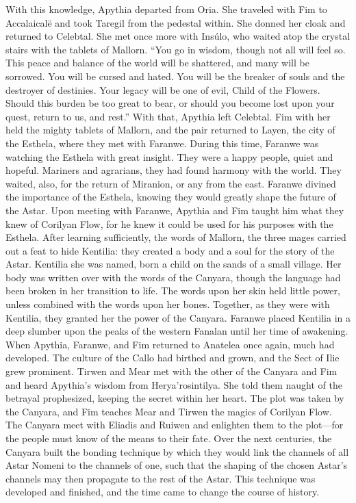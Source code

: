 \documentclass[smalldemyvopaper,11pt,twoside,onecolumn,openright,extrafontsizes]{memoir}
\begin{document}
{{With this knowledge, Apythia departed from Oria. She traveled with Fim to Accalaicalë and took Taregil from the pedestal within. She donned her cloak and returned to Celebtal. She met once more with Insúlo, who waited atop the crystal stairs with the tablets of Mallorn.
“You go in wisdom, though not all will feel so. This peace and balance of the world will be shattered, and many will be sorrowed. You will be cursed and hated. You will be the breaker of souls and the destroyer of destinies. Your legacy will be one of evil, Child of the Flowers. Should this burden be too great to bear, or should you become lost upon your quest, return to us, and rest.”
With that, Apythia left Celebtal. Fim with her held the mighty tablets of Mallorn, and the pair returned to Layen, the city of the Esthela, where they met with Faranwe.
During this time, Faranwe was watching the Esthela with great insight. They were a happy people, quiet and hopeful. Mariners and agrarians, they had found harmony with the world. They waited, also, for the return of Miranion, or any from the east. Faranwe divined the importance of the Esthela, knowing they would greatly shape the future of the Astar.
Upon meeting with Faranwe, Apythia and Fim taught him what they knew of Corilyan Flow, for he knew it could be used for his purposes with the Esthela. After learning sufficiently, the words of Mallorn, the three mages carried out a feat to hide Kentilia: they created a body and a soul for the story of the Astar. Kentilia she was named, born a child on the sands of a small village. Her body was written over with the words of the Canyara, though the language had been broken in her transition to life. The words upon her skin held little power, unless combined with the words upon her bones. Together, as they were with Kentilia, they granted her the power of the Canyara. Faranwe placed Kentilia in a deep slumber upon the peaks of the western Fanalan until her time of awakening.
When Apythia, Faranwe, and Fim returned to Anatelea once again, much had developed. The culture of the Callo had birthed and grown, and the Sect of Ilie grew prominent. Tirwen and Mear met with the other of the Canyara and Fim and heard Apythia’s wisdom from Herya’rosintilya. She told them naught of the betrayal prophesized, keeping the secret within her heart. The plot was taken by the Canyara, and Fim teaches Mear and Tirwen the magics of Corilyan Flow. The Canyara meet with Eliadis and Ruiwen and enlighten them to the plot—for the people must know of the means to their fate. Over the next centuries, the Canyara built the bonding technique by which they would link the channels of all Astar Nomeni to the channels of one, such that the shaping of the chosen Astar’s channels may then propagate to the rest of the Astar. This technique was developed and finished, and the time came to change the course of history.
}}
\end{document}
